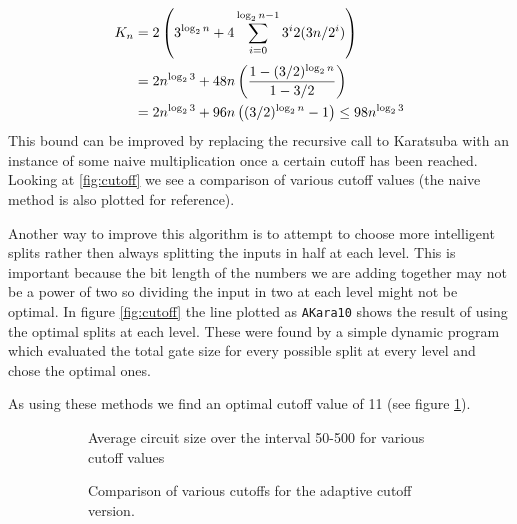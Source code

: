       \begin{align}
        K_n &= 2\left(3^{\log_2 n } + 4 \sum_{i=0}^{\log_2 n - 1} 3^i 2(3n/2^i)\right)\notag\\
            &= 2n^{\log_2 3} + 48n \left(\frac{1- (3/2)^{\log_2 n}}{1-3/2}\right) \notag\\
            &= 2n^{\log_2 3} + 96n \left((3/2)^{\log_2{n}} -1\right) \leq 98 n^{\log_2{3}}
      \end{align}
      This bound can be improved by replacing the recursive call to Karatsuba with an instance of some naive multiplication once a certain cutoff has been reached. 
      Looking at \cref{fig:cutoff} we see a comparison of various cutoff values (the naive method is also plotted for reference). 

      Another way to improve this algorithm is to attempt to choose more intelligent splits rather then always splitting the inputs in half at each level.
      This is important because the bit length of the numbers we are adding together may not be a power of two so dividing the input in two at each level might not be optimal.
      In figure \ref{fig:cutoff} the line plotted as \verb+AKara10+ shows the result of using the optimal splits at each level.
      These were found by a simple dynamic program which evaluated the total gate size for every possible split at every level and chose the optimal ones.
		
      As using these methods we find an optimal cutoff value of 11 (see figure \ref{fig:cutoffs}).
      \begin{figure}[ht]
        \centering
        \begin{subfigure}[b]{0.45\textwidth}
        \capstart
        \caption{Average circuit size over the interval 50-500 for various cutoff values}
        \label{fig:cutoffs}
      \end{subfigure}
      \hfill
      \begin{subfigure}[b]{0.45\textwidth}
        \capstart
        \caption{Comparison of various cutoffs for the adaptive cutoff version.}
        \label{fig:aKara}
      \end{subfigure}
      \caption{}
      \end{figure}

